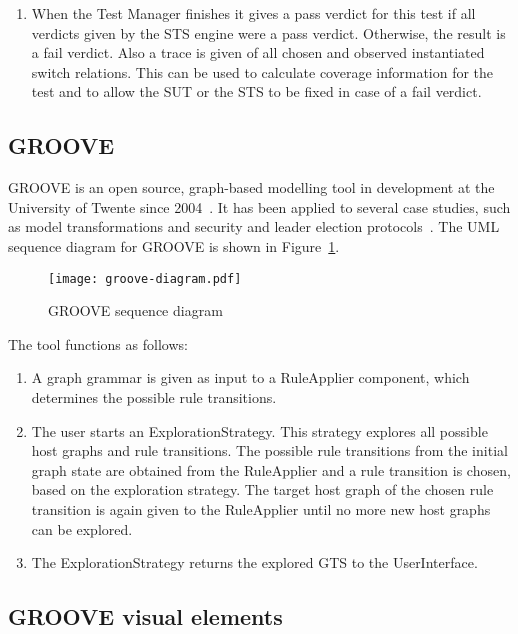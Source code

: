 \begin{enumerate}
  \item When the Test Manager finishes it gives a pass verdict for this test if all verdicts given by the STS engine were a pass verdict. Otherwise, the result is a fail verdict. Also a trace is given of all chosen and observed instantiated switch relations. This can be used to calculate coverage information for the test and to allow the SUT or the STS to be fixed in case of a fail verdict.
\end{enumerate}

\subsection{GROOVE}\label{sec:descriptiongroove}
GROOVE is an open source, graph-based modelling tool in development at the University of Twente since 2004~\cite{Rensink:GROOVE}. It has been applied to several case studies, such as model transformations and security and leader election protocols~\cite{Ghamarian:GROOVE}. The UML sequence diagram for GROOVE is shown in Figure~\ref{fig:groove_tool}.

\begin{figure}[h]
  \begin{center}
    \texttt{[image: groove-diagram.pdf]}
  \end{center}
  \caption{GROOVE sequence diagram}
  \label{fig:groove_tool}
\end{figure}

The tool functions as follows:
\begin{enumerate}
\item A graph grammar is given as input to a RuleApplier component, which determines the possible rule transitions.
\item The user starts an ExplorationStrategy. This strategy explores all possible host graphs and rule transitions. The possible rule transitions from the initial graph state are obtained from the RuleApplier and a rule transition is chosen, based on the exploration strategy. The target host graph of the chosen rule transition is again given to the RuleApplier until no more new host graphs can be explored.
\item The ExplorationStrategy returns the explored GTS to the UserInterface.
\end{enumerate}

\subsection{GROOVE visual elements}
